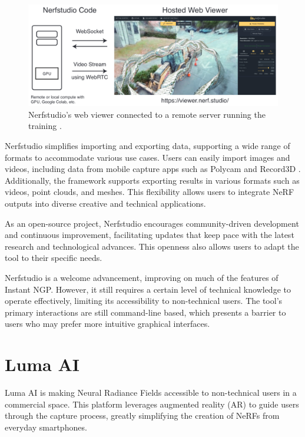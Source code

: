 \begin{figure}[h!]
  \centering
  \includegraphics[width=\textwidth]{figures/related-nerfstudio-viewer.png}
  \caption{Nerfstudio's web viewer connected to a remote server running the training \cite{tancik_nerfstudio_2023}.}
  \label{fig:nerfstudio-viewer}
\end{figure}

Nerfstudio simplifies importing and exporting data, supporting a wide range of formats to accommodate various use cases.
Users can easily import images and videos, including data from mobile capture apps such as Polycam \cite{noauthor_polycam_nodate} and Record3D \cite{noauthor_record3d_nodate}.
Additionally, the framework supports exporting results in various formats such as videos, point clouds, and meshes.
This flexibility allows users to integrate NeRF outputs into diverse creative and technical applications.

As an open-source project, Nerfstudio encourages community-driven development and continuous improvement, facilitating updates that keep pace with the latest research and technological advances.
This openness also allows users to adapt the tool to their specific needs.

Nerfstudio is a welcome advancement, improving on much of the features of Instant NGP. 
However, it still requires a certain level of technical knowledge to operate effectively, limiting its accessibility to non-technical users.
The tool's primary interactions are still command-line based, which presents a barrier to users who may prefer more intuitive graphical interfaces.

\section{Luma AI}
\label{sec:related:luma}

Luma AI \cite{noauthor_luma_nodate} is making Neural Radiance Fields accessible to non-technical users in a commercial space.
This platform leverages augmented reality (AR) to guide users through the capture process, greatly simplifying the creation of NeRFs from everyday smartphones.

